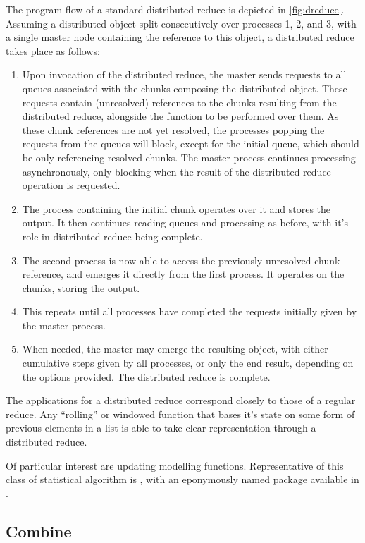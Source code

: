 The program flow of a standard distributed reduce is depicted in \cref{fig:dreduce}.
Assuming a distributed object split consecutively over processes 1, 2, and 3, with a single master node containing the reference to this object, a distributed reduce takes place as follows:
\begin{enumerate}
	\item Upon invocation of the distributed reduce, the master sends requests to all queues associated with the chunks composing the distributed object. These requests contain (unresolved) references to the chunks resulting from the distributed reduce, alongside the function to be performed over them. As these chunk references are not yet resolved, the processes popping the requests from the queues will block, except for the initial queue, which should be only referencing resolved chunks. The master process continues processing asynchronously, only blocking when the result of the distributed reduce operation is requested.
	\item The process containing the initial chunk operates over it and stores the output. It then continues reading queues and processing as before, with it's role in distributed reduce being complete.
	\item The second process is now able to access the previously unresolved chunk reference, and emerges it directly from the first process. It operates on the chunks, storing the output.
	\item This repeats until all processes have completed the requests initially given by the master process.
	\item When needed, the master may emerge the resulting object, with either cumulative steps given by all processes, or only the end result, depending on the options provided. The distributed reduce is complete.
\end{enumerate}

The applications for a distributed reduce correspond closely to those of a regular reduce.
Any ``rolling'' or windowed function that bases it's state on some form of previous elements in a list is able to take clear representation through a distributed reduce.

Of particular interest are updating modelling functions.
Representative of this class of statistical algorithm is , with an eponymously named package available in \R.

\subsection{Combine}\label{sec:combine}

